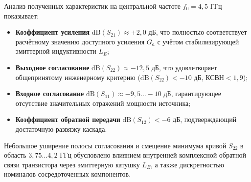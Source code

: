 Анализ полученных характеристик на центральной частоте $f_0 = 4{,}5\text{ ГГц}$ показывает:
\begin{itemize}
    \item \textbf{Коэффициент усиления} $\mathrm{dB}(S_{21}) \approx +2{,}0\text{ дБ}$, что полностью соответствует расчётному значению доступного усиления $G_a$ с учётом стабилизирующей эмиттерной индуктивности $L_E$;
    \item \textbf{Выходное согласование} $\mathrm{dB}(S_{22}) \approx -12{,}5\text{ дБ}$, что удовлетворяет общепринятому инженерному критерию ($\mathrm{dB}(S_{22}) < -10\text{ дБ}$, $\text{КСВН} < 1{,}9$);
    \item \textbf{Входное согласование} $\mathrm{dB}(S_{11}) \approx -9{,}5\dots -10\text{ дБ}$, гарантирующее отсутствие значительных отражений мощности источника;
    \item \textbf{Коэффициент обратной передачи} $\mathrm{dB}(S_{12}) < -6\text{ дБ}$, подтверждающий достаточную развязку каскада.
\end{itemize}

Небольшое уширение полосы согласования и смещение минимума кривой $S_{22}$ в область $3{,}75\dots 4{,}2\text{ ГГц}$ обусловлено влиянием внутренней комплексной обратной связи транзистора через эмиттерную катушку $L_E$, а также дискретностью номиналов сосредоточенных компонентов.
